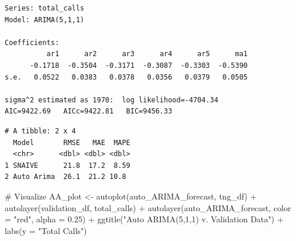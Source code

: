 \documentclass[
  letterpaper,
  DIV=11,
  numbers=noendperiod]{scrartcl}
\newenvironment{Shaded}{\begin{snugshade}}{\end{snugshade}}
\newcommand{\AttributeTok}[1]{\textcolor[rgb]{0.40,0.45,0.13}{#1}}
\newcommand{\CommentTok}[1]{\textcolor[rgb]{0.37,0.37,0.37}{#1}}
\newcommand{\FloatTok}[1]{\textcolor[rgb]{0.68,0.00,0.00}{#1}}
\newcommand{\FunctionTok}[1]{\textcolor[rgb]{0.28,0.35,0.67}{#1}}
\newcommand{\NormalTok}[1]{\textcolor[rgb]{0.00,0.23,0.31}{#1}}
\newcommand{\OtherTok}[1]{\textcolor[rgb]{0.00,0.23,0.31}{#1}}
\newcommand{\SpecialCharTok}[1]{\textcolor[rgb]{0.37,0.37,0.37}{#1}}
\newcommand{\StringTok}[1]{\textcolor[rgb]{0.13,0.47,0.30}{#1}}
\begin{document}
\begin{verbatim}
Series: total_calls 
Model: ARIMA(5,1,1) 

Coefficients:
          ar1      ar2      ar3      ar4      ar5      ma1
      -0.1718  -0.3504  -0.3171  -0.3087  -0.3303  -0.5390
s.e.   0.0522   0.0383   0.0378   0.0356   0.0379   0.0505

sigma^2 estimated as 1970:  log likelihood=-4704.34
AIC=9422.69   AICc=9422.81   BIC=9456.33
\end{verbatim}

\begin{Shaded}
\end{Shaded}

\begin{verbatim}
# A tibble: 2 x 4
  Model       RMSE   MAE  MAPE
  <chr>      <dbl> <dbl> <dbl>
1 SNAIVE      21.8  17.2  8.59
2 Auto Arima  26.1  21.2 10.8 
\end{verbatim}

\begin{Shaded}
\begin{Highlighting}[]
\CommentTok{\# Visualize}
\NormalTok{AA\_plot }\OtherTok{\textless{}{-}} \FunctionTok{autoplot}\NormalTok{(auto\_ARIMA\_forecast, tng\_df) }\SpecialCharTok{+} 
  \FunctionTok{autolayer}\NormalTok{(validation\_df, total\_calls) }\SpecialCharTok{+} 
  \FunctionTok{autolayer}\NormalTok{(auto\_ARIMA\_forecast, }\AttributeTok{color =} \StringTok{"red"}\NormalTok{, }\AttributeTok{alpha =} \FloatTok{0.25}\NormalTok{) }\SpecialCharTok{+}
  \FunctionTok{ggtitle}\NormalTok{(}\StringTok{"Auto ARIMA(5,1,1) v. Validation Data"}\NormalTok{) }\SpecialCharTok{+} 
  \FunctionTok{labs}\NormalTok{(}\AttributeTok{y =} \StringTok{"Total Calls"}\NormalTok{)}
\end{Highlighting}
\end{Shaded}
\end{document}
